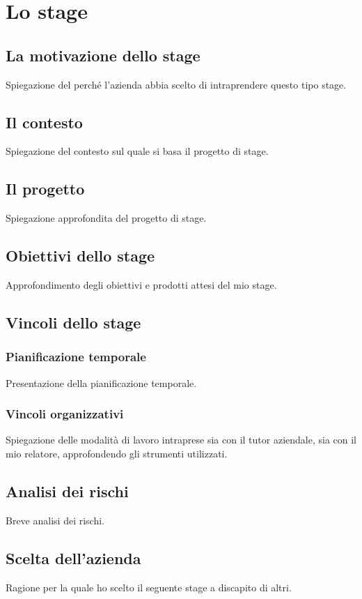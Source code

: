 
\chapter{Lo stage}
\label{cap:stage}

\section{La motivazione dello stage}
Spiegazione del perché l'azienda abbia scelto di intraprendere questo tipo stage.

\section{Il contesto}
Spiegazione del contesto sul quale si basa il progetto di stage.

\section{Il progetto}
Spiegazione approfondita del progetto di stage.

\section{Obiettivi dello stage}
Approfondimento degli obiettivi e prodotti attesi del mio stage.

\section{Vincoli dello stage}

\subsection{Pianificazione temporale}
Presentazione della pianificazione temporale.

\subsection{Vincoli organizzativi}
Spiegazione delle modalità di lavoro intraprese sia con il tutor aziendale, sia con il mio relatore, approfondendo gli strumenti utilizzati.

\section{Analisi dei rischi}
Breve analisi dei rischi.

\section{Scelta dell'azienda}
Ragione per la quale ho scelto il seguente stage a discapito di altri.

